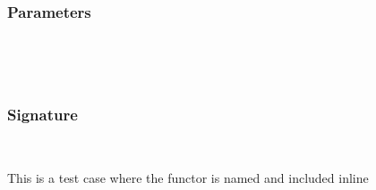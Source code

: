 \\
\label{Oxcaml--module-Include_functor_inline}\label{Oxcaml-Include_functor_inline}\begin{ocamlindent}\label{Oxcaml-Include_functor_inline--module-type-Make}\label{Oxcaml-Include_functor_inline-module-type-Make}\begin{ocamlindent}\subsubsection{Parameters\label{Oxcaml-Include_functor_inline-module-type-Make--parameters_7}}%
\label{Oxcaml-Include_functor_inline-module-type-Make--argument-1-_}\label{Oxcaml-Include_functor_inline-module-type-Make-argument-1-_}\begin{ocamlindent}\label{Oxcaml-Include_functor_inline-module-type-Make-argument-1-_--type-t}\\
\end{ocamlindent}%
\\
\subsubsection{Signature\label{Oxcaml-Include_functor_inline-module-type-Make--signature_7}}%
\label{Oxcaml-Include_functor_inline-module-type-Make--type-included}\\
\end{ocamlindent}%
\begin{ocamlindent}This is a test case where the functor is named and included inline\end{ocamlindent}%
\medbreak
\label{Oxcaml-Include_functor_inline--type-t}\\
 \hyperref[Oxcaml-Include_functor_inline-module-type-Make]{}\label{Oxcaml-Include_functor_inline--type-included}\\
\end{ocamlindent}%
